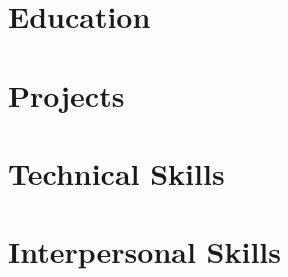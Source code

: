 \documentclass[12pt]{report}
\begin{document}
\section*{Education}
\section*{Projects}
\section*{Technical Skills}
\section*{Interpersonal Skills}
\end{document}
